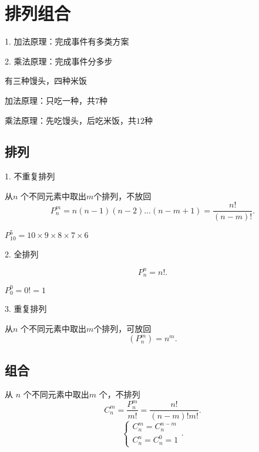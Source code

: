 \def\lecturer{SongHao}
\def\noter{THF}
\def\className{Probability Theory and Mathematical Statistics}
\def\term{III-A}



\maketitle
\tableofcontents
\section{排列组合}%
\label{sub:排列组合}
1. 加法原理：完成事件有多类方案

2. 乘法原理：完成事件分多步

\begin{eg}
    有三种馒头，四种米饭

    加法原理：只吃一种，共$7$种

    乘法原理：先吃馒头，后吃米饭，共$12$种
\end{eg}
\subsection{排列}%
\label{sub:排列}
1. 不重复排列

从$n$ 个不同元素中取出$m$个排列，不放回
\[
    P_n^m=n\left( n-1 \right) \left( n-2 \right) \ldots\left( n-m+1 \right)=\frac{n!}{\left( n-m \right) !} 
.\] 
\begin{eg}
    $P^5_{10}=10\times 9\times 8\times 7\times 6$
\end{eg}

2. 全排列

\[
    P^n_n=n!
.\] 
\begin{eg}
    $P_{0}^{0}=0! =1$
\end{eg}

3. 重复排列

从$n$ 个不同元素中取出$m$个排列，可放回
\[
    (P_n^m)=n^m
.\] 

\subsection{组合}%
\label{sub:组合}

从 $n$ 个不同元素中取出$m$ 个，不排列
\[
    C_n^m=\frac{P_n^m}{m!}=\frac{n!}{\left( n-m \right)! m!}
.\] 
\[
    \begin{cases}
        C_{n}^{m}=C_{n}^{n-m}\\
        C_{n}^{n}=C_{n}^{0}=1
    \end{cases}
.\] 

